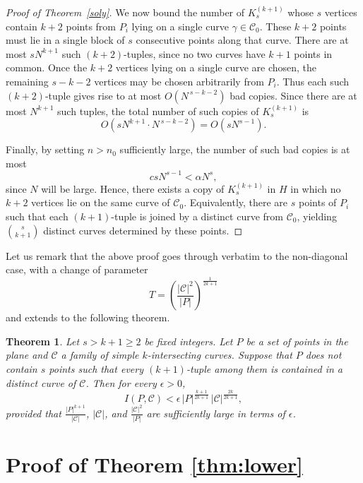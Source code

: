 \documentclass[11pt]{article}
\theoremstyle{plain}
\newtheorem{theorem}{Theorem}[section]
\theoremstyle{definition}
\theoremstyle{remark}
\begin{document}
\begin{proof}[Proof of Theorem~\ref{soly}]
We now bound the number of $K^{(k+1)}_s$ whose $s$ vertices contain $k + 2$ points from $P_i$ lying on a single curve $\gamma\in\mathcal C_0$. These $k + 2$ points must lie in a single block of $s$ consecutive points along that curve.  There are at most $sN^{k + 1}$ such $(k +2)$-tuples, since no two curves have $k + 1$ points in common. Once the \(k+2\) vertices lying on a single curve are chosen, the remaining \(s-k-2\) vertices may be chosen arbitrarily from \(P_i\). Thus each such $(k+2)$-tuple gives rise to at most \(O(N^{\,s-k-2})\) bad copies. Since there are at most \(N^{k+1}\) such tuples, the total number of such copies of $K_s^{(k + 1)}$ is
\[
O\!\left(sN^{k+1}\cdot N^{\,s-k-2}\right)=O(sN^{s-1}).
\]

 Finally, by setting $n > n_0$ sufficiently large, the number of such bad copies is at most
\[
csN^{s-1} < \alpha N^s,
\]
since \(N\) will be large. Hence, there exists a copy of \(K^{(k + 1)}_s\) in $H$ in which no $k + 2$ vertices lie on the same curve of \(\mathcal C_0\). Equivalently, there are \(s\) points of \(P_i\) such that each $(k + 1)$-tuple  is joined by a distinct curve from \(\mathcal C_0\), yielding \(\binom{s}{k + 1}\) distinct curves determined by these points.
\end{proof}

\medskip

Let us remark that the above proof goes through verbatim to the non-diagonal case, with a change of parameter 
\[
T=\left( \frac{|\mathcal{C}|^2}{|P|}\right)^{\frac{1}{2k+1}}
\]
and extends to the following theorem. 
\begin{theorem}
Let \(s>k+1\ge 2\) be fixed integers. Let \(P\) be a set of points in the plane and \(\mathcal C\) a family of simple \(k\)-intersecting curves. Suppose that \(P\) does not contain \(s\) points such that every \((k+1)\)-tuple among them is contained in a distinct curve of \(\mathcal C\). Then for every \(\epsilon>0\),
\[
I(P,\mathcal C)< \epsilon\, |P|^{\frac{k+1}{2k+1}}\,|\mathcal{C}|^{\frac{2k}{2k+1}},
\]
provided that \(\frac{|P|^{k+1}}{|\mathcal{C}|}\), \(|\mathcal{C}|\), and \(\frac{|\mathcal{C}|^2}{|P|}\) are sufficiently large in terms of \(\epsilon\).
\end{theorem}







\section{Proof of Theorem \ref{thm:lower}}\label{sec:lower}
\end{document}
